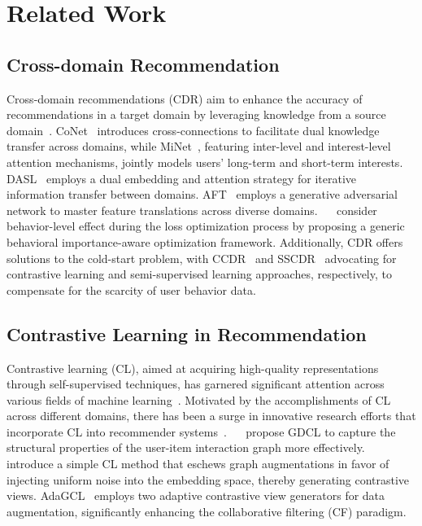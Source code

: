\section{Related Work}
\label{sec:related-works}
\subsection{Cross-domain Recommendation}
Cross-domain recommendations (CDR) aim to enhance the accuracy of recommendations in a target domain by leveraging knowledge from a source domain~\cite{zhao2023beyond,zhang2023collaborative,zhao2023cross,liu2024graph}. CoNet~\cite{hu2018conet} introduces cross-connections to facilitate dual knowledge transfer across domains, while MiNet~\cite{ouyang2020minet}, featuring inter-level and interest-level attention mechanisms, jointly models users' long-term and short-term interests. DASL~\cite{li2021dual} employs a dual embedding and attention strategy for iterative information transfer between domains. AFT~\cite{hao2021adversarial} employs a generative adversarial network to master feature translations across diverse domains. ~\citeauthor{chen2023cross}~\cite{chen2023cross} consider behavior-level effect during the loss optimization process by proposing a generic behavioral importance-aware optimization framework. Additionally, CDR offers solutions to the cold-start problem, with CCDR~\cite{xie2022contrastive} and SSCDR~\cite{kang2019semi} advocating for contrastive learning and semi-supervised learning approaches, respectively, to compensate for the scarcity of user behavior data.

\subsection{Contrastive Learning in Recommendation}
Contrastive learning (CL), aimed at acquiring high-quality representations through self-supervised techniques, has garnered significant attention across various fields of machine learning~\cite{chen2020simple,zhu2021graph,gutmann2010noise}. Motivated by the accomplishments of CL across different domains, there has been a surge in innovative research efforts that incorporate CL into recommender systems~\cite{qiu2021memory,zhou2020s3,ma2020disentangled}. ~\citeauthor{zhang2022diffusion}~\cite{zhang2022diffusion} propose GDCL to capture the structural properties of the user-item interaction graph more effectively. \citeauthor{yu2022graph}~\cite{yu2022graph} introduce a simple CL method that eschews graph augmentations in favor of injecting uniform noise into the embedding space, thereby generating contrastive views. AdaGCL~\cite{jiang2023adaptive} employs two adaptive contrastive view generators for data augmentation, significantly enhancing the collaborative filtering (CF) paradigm.